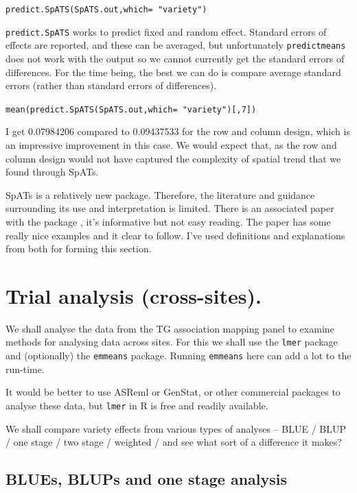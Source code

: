 \documentclass[
]{book}
\begin{document}
\texttt{predict.SpATS(SpATS.out,which=\ "variety")}

\texttt{predict.SpATS} works to predict fixed and random effect. Standard errors of effects are reported, and these can be averaged, but unfortunately \texttt{predictmeans} does not work with the output so we cannot currently get the standard errors of differences. For the time being, the best we can do is compare average standard errors (rather than standard errors of differences).

\texttt{mean(predict.SpATS(SpATS.out,which=\ "variety"){[},7{]})}

I get 0.07984206 compared to 0.09437533 for the row and column design, which is an impressive improvement in this case. We would expect that, as the row and column design would not have captured the complexity of spatial trend that we found through SpATs.

SpATs is a relatively new package. Therefore, the literature and guidance surrounding its use and interpretation is limited. There is an associated paper with the package \citep{rodríguezálvarez2016}, it's informative but not easy reading. The paper \citet{velazco_modelling_2017} has some really nice examples and it clear to follow. I've used definitions and explanations from both for forming this section.

\hypertarget{Cross-site-analysis}{%
\chapter{Trial analysis (cross-sites).}\label{Cross-site-analysis}}

We shall analyse the data from the TG association mapping panel to examine methods for analysing data across sites. For this we shall use the \texttt{lmer} package and (optionally) the \texttt{emmeans} package. Running \texttt{emmeans} here can add a lot to the run-time.

It would be better to use ASReml or GenStat, or other commercial packages to analyse these data, but \texttt{lmer} in R is free and readily available.

We shall compare variety effects from various types of analyses -- BLUE / BLUP / one stage / two stage / weighted / and see what sort of a difference it makes?

\hypertarget{blues-blups-and-one-stage-analysis}{%
\section{BLUEs, BLUPs and one stage analysis}\label{blues-blups-and-one-stage-analysis}}
\end{document}
